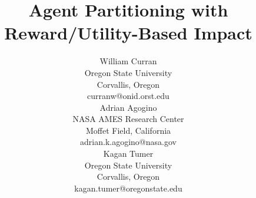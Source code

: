 \documentclass[letterpaper]{article}
\begin{document}





\title{Agent Partitioning with Reward/Utility-Based Impact}
\author{William Curran \\
Oregon State University \\
Corvallis, Oregon \\
curranw@onid.orst.edu \\
\And
Adrian Agogino \\
NASA AMES Research Center \\
Moffet Field, California \\
adrian.k.agogino@nasa.gov \\
\And 
Kagan Tumer \\
Oregon State University \\
Corvallis, Oregon \\
kagan.tumer@oregonstate.edu \\
}



\maketitle
\end{document}
